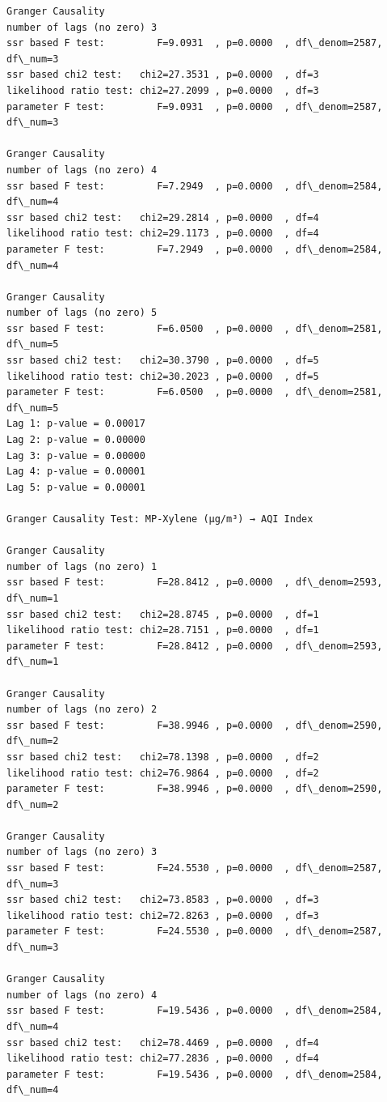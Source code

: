 \documentclass[11pt]{article}
\begin{document}
\begin{Verbatim}[commandchars=\\\{\}]
Granger Causality
number of lags (no zero) 3
ssr based F test:         F=9.0931  , p=0.0000  , df\_denom=2587, df\_num=3
ssr based chi2 test:   chi2=27.3531 , p=0.0000  , df=3
likelihood ratio test: chi2=27.2099 , p=0.0000  , df=3
parameter F test:         F=9.0931  , p=0.0000  , df\_denom=2587, df\_num=3

Granger Causality
number of lags (no zero) 4
ssr based F test:         F=7.2949  , p=0.0000  , df\_denom=2584, df\_num=4
ssr based chi2 test:   chi2=29.2814 , p=0.0000  , df=4
likelihood ratio test: chi2=29.1173 , p=0.0000  , df=4
parameter F test:         F=7.2949  , p=0.0000  , df\_denom=2584, df\_num=4

Granger Causality
number of lags (no zero) 5
ssr based F test:         F=6.0500  , p=0.0000  , df\_denom=2581, df\_num=5
ssr based chi2 test:   chi2=30.3790 , p=0.0000  , df=5
likelihood ratio test: chi2=30.2023 , p=0.0000  , df=5
parameter F test:         F=6.0500  , p=0.0000  , df\_denom=2581, df\_num=5
Lag 1: p-value = 0.00017
Lag 2: p-value = 0.00000
Lag 3: p-value = 0.00000
Lag 4: p-value = 0.00001
Lag 5: p-value = 0.00001

Granger Causality Test: MP-Xylene (µg/m³) → AQI Index

Granger Causality
number of lags (no zero) 1
ssr based F test:         F=28.8412 , p=0.0000  , df\_denom=2593, df\_num=1
ssr based chi2 test:   chi2=28.8745 , p=0.0000  , df=1
likelihood ratio test: chi2=28.7151 , p=0.0000  , df=1
parameter F test:         F=28.8412 , p=0.0000  , df\_denom=2593, df\_num=1

Granger Causality
number of lags (no zero) 2
ssr based F test:         F=38.9946 , p=0.0000  , df\_denom=2590, df\_num=2
ssr based chi2 test:   chi2=78.1398 , p=0.0000  , df=2
likelihood ratio test: chi2=76.9864 , p=0.0000  , df=2
parameter F test:         F=38.9946 , p=0.0000  , df\_denom=2590, df\_num=2

Granger Causality
number of lags (no zero) 3
ssr based F test:         F=24.5530 , p=0.0000  , df\_denom=2587, df\_num=3
ssr based chi2 test:   chi2=73.8583 , p=0.0000  , df=3
likelihood ratio test: chi2=72.8263 , p=0.0000  , df=3
parameter F test:         F=24.5530 , p=0.0000  , df\_denom=2587, df\_num=3

Granger Causality
number of lags (no zero) 4
ssr based F test:         F=19.5436 , p=0.0000  , df\_denom=2584, df\_num=4
ssr based chi2 test:   chi2=78.4469 , p=0.0000  , df=4
likelihood ratio test: chi2=77.2836 , p=0.0000  , df=4
parameter F test:         F=19.5436 , p=0.0000  , df\_denom=2584, df\_num=4


\end{Verbatim}
\end{document}
